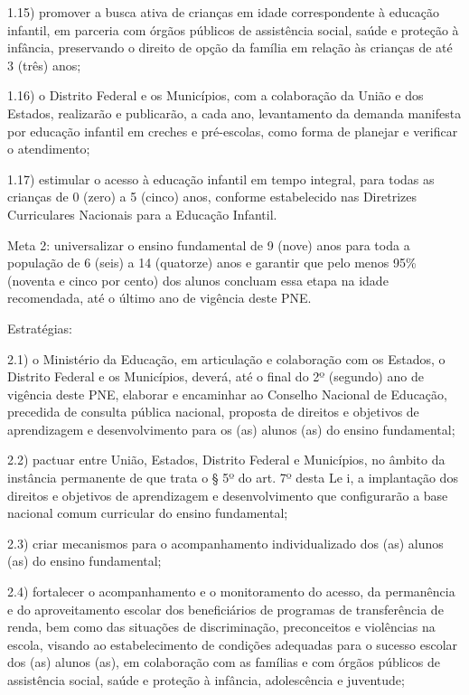 \documentclass[
]{book}
\begin{document}
1.15) promover a busca ativa de crianças em idade correspondente à educação infantil, em parceria com órgãos públicos de assistência social, saúde e proteção à infância, preservando o direito de opção da família em relação às crianças de até 3 (três) anos;

1.16) o Distrito Federal e os Municípios, com a colaboração da União e dos Estados, realizarão e publicarão, a cada ano, levantamento da demanda manifesta por educação infantil em creches e pré-escolas, como forma de planejar e verificar o atendimento;

1.17) estimular o acesso à educação infantil em tempo integral, para todas as crianças de 0 (zero) a 5 (cinco) anos, conforme estabelecido nas Diretrizes Curriculares Nacionais para a Educação Infantil.

Meta 2: universalizar o ensino fundamental de 9 (nove) anos para toda a população de 6 (seis) a 14 (quatorze) anos e garantir que pelo menos 95\% (noventa e cinco por cento) dos alunos concluam essa etapa na idade recomendada, até o último ano de vigência deste PNE.

Estratégias:

2.1) o Ministério da Educação, em articulação e colaboração com os Estados, o Distrito Federal e os Municípios, deverá, até o final do 2º (segundo) ano de vigência deste PNE, elaborar e encaminhar ao Conselho Nacional de Educação, precedida de consulta pública nacional, proposta de direitos e objetivos de aprendizagem e desenvolvimento para os (as) alunos (as) do ensino fundamental;

2.2) pactuar entre União, Estados, Distrito Federal e Municípios, no âmbito da instância permanente de que trata o § 5º do art. 7º desta Le i, a implantação dos direitos e objetivos de aprendizagem e desenvolvimento que configurarão a base nacional comum curricular do ensino fundamental;

2.3) criar mecanismos para o acompanhamento individualizado dos (as) alunos (as) do ensino fundamental;

2.4) fortalecer o acompanhamento e o monitoramento do acesso, da permanência e do aproveitamento escolar dos beneficiários de programas de transferência de renda, bem como das situações de discriminação, preconceitos e violências na escola, visando ao estabelecimento de condições adequadas para o sucesso escolar dos (as) alunos (as), em colaboração com as famílias e com órgãos públicos de assistência social, saúde e proteção à infância, adolescência e juventude;
\end{document}

